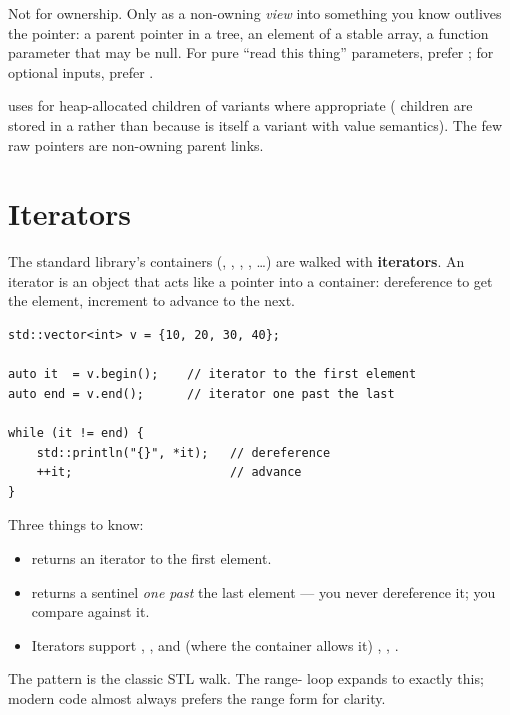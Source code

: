 Not for ownership. Only as a non-owning \emph{view} into something
you know outlives the pointer: a parent pointer in a tree, an
element of a stable array, a function parameter that may be null.
For pure ``read this thing'' parameters, prefer ;
for optional inputs, prefer .

\maya{} uses  for heap-allocated children of
variants where appropriate ( children are stored in a
 rather than 
because  is itself a variant with value semantics).
The few raw pointers are non-owning parent links.

\section{Iterators}
\label{sec:cpp:iterators}

The standard library's containers (, ,
, , \dots) are walked with
\textbf{iterators}. An iterator is an object that acts like a
pointer into a container: dereference to get the element, increment
to advance to the next.

\begin{lstlisting}
std::vector<int> v = {10, 20, 30, 40};

auto it  = v.begin();    // iterator to the first element
auto end = v.end();      // iterator one past the last

while (it != end) {
    std::println("{}", *it);   // dereference
    ++it;                      // advance
}
\end{lstlisting}

Three things to know:

\begin{itemize}[leftmargin=*]
  \item {} returns an iterator to the first element.
  \item {} returns a sentinel \emph{one past} the last
    element --- you never dereference it; you compare against it.
  \item Iterators support \code{*}, \code{++}, and (where the
    container allows it) \code{--}, , .
\end{itemize}

The pattern 
is the classic STL walk. The range- loop
 expands to exactly this; modern code
almost always prefers the range form for clarity.

